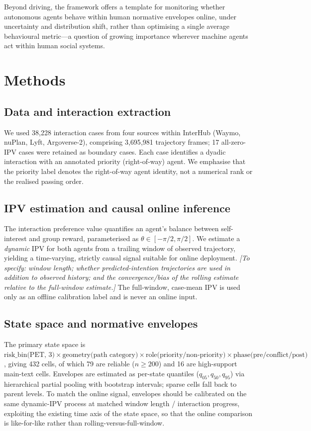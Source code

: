 \documentclass[12pt,a4paper]{article}
\begin{document}
Beyond driving, the framework offers a template for monitoring whether autonomous agents
behave within human normative envelopes online, under uncertainty and distribution shift,
rather than optimising a single average behavioural metric---a question of growing
importance wherever machine agents act within human social systems.

\section{Methods}

\subsection{Data and interaction extraction}
We used 38{,}228 interaction cases from four sources within InterHub (Waymo, nuPlan, Lyft,
Argoverse-2), comprising 3{,}695{,}981 trajectory frames; 17 all-zero-IPV cases were
retained as boundary cases. Each case identifies a dyadic interaction with an annotated
priority (right-of-way) agent. We emphasise that the priority label denotes the
right-of-way agent identity, not a numerical rank or the realised passing order.

\subsection{IPV estimation and causal online inference}
The interaction preference value quantifies an agent's balance between self-interest and
group reward, parameterised as $\theta\in[-\pi/2,\pi/2]$. We estimate a \emph{dynamic} IPV
for both agents from a trailing window of observed trajectory, yielding a time-varying,
strictly causal signal suitable for online deployment. \emph{[To specify: window length;
whether predicted-intention trajectories are used in addition to observed history; and the
convergence/bias of the rolling estimate relative to the full-window estimate.]} The
full-window, case-mean IPV is used only as an offline calibration label and is never an
online input.

\subsection{State space and normative envelopes}
The primary state space is
$\text{risk\_bin(PET, 3)}\times\text{geometry(path category)}\times
\text{role(priority/non-priority)}\times\text{phase(pre/conflict/post)}$, giving 432 cells,
of which 79 are reliable ($n\ge200$) and 16 are high-support main-text cells. Envelopes are
estimated as per-state quantiles ($q_{05},q_{50},q_{95}$) via hierarchical partial pooling
with bootstrap intervals; sparse cells fall back to parent levels. To match the online
signal, envelopes should be calibrated on the same dynamic-IPV process at matched
window length / interaction progress, exploiting the existing time axis of the state space,
so that the online comparison is like-for-like rather than rolling-versus-full-window.
\end{document}
